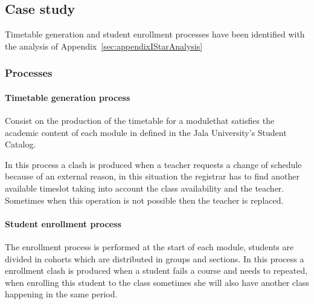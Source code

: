 \subsection{Case study}
Timetable generation and student enrollment processes have been identified with the analysis of Appendix~\ref{sec:appendixIStarAnalysis}

\subsubsection{Processes}
\paragraph{Timetable generation process} Consist on the production of the timetable for a modulethat satisfies the academic content of each module in defined in the Jala University's Student Catalog.

In this process a clash is produced when a teacher requests a change of schedule because of an external reason, in this situation the registrar has to find another available timeslot taking into account the class availability and the teacher.
Sometimes when this operation is not possible then the teacher is replaced.

\paragraph{Student enrollment process} The enrollment process is performed at the start of each module, students are divided in cohorts which are distributed in groups and sections.
In this process a enrollment clash is produced when a student fails a course and needs to repeated, when enrolling this student to the class sometimes she will also have another class happening in the same period.
